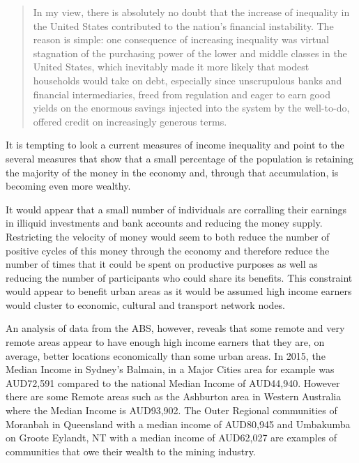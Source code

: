 \begin{quotation}
In my view, there is absolutely no doubt that the increase of inequality in the United States contributed to the nation's financial instability.  The reason is simple: one consequence of increasing inequality was virtual stagnation of the purchasing power of the lower and middle classes in the United States, which inevitably made it more likely that modest households would take on debt, especially since unscrupulous banks and financial intermediaries, freed from regulation and eager to earn good yields on the enormous savings injected into the system by the well-to-do, offered credit on increasingly generous terms\cite[pp. 372-373]{Piketty}.
\end{quotation}

 

It is tempting to look a current measures of income inequality and point to the several measures that show that a small percentage of the population is retaining the majority of the money in the economy and, through that accumulation, is becoming even more wealthy. 

It would appear that a small number of individuals are corralling their earnings in illiquid investments and bank accounts and reducing the money supply. Restricting the velocity of money would seem to both reduce the number of positive cycles of this money through the economy and therefore reduce the number of times that it could be spent on productive purposes as well as reducing the number of participants who could share its benefits. This constraint would appear to benefit urban areas as it would be assumed high income earners would cluster to economic, cultural and transport network nodes. 

An analysis of data from the ABS, however, reveals that some remote and very remote areas appear to have enough high income earners that they are, on average, better locations economically than some urban areas. In 2015, the Median Income in Sydney's Balmain, in a Major Cities area for example was AUD72,591 compared to the national Median Income of AUD44,940. However there are some Remote areas such as the Ashburton area in Western Australia where the Median Income is AUD93,902. The Outer Regional communities of Moranbah in Queensland with a median income of AUD80,945 and Umbakumba on  Groote Eylandt, NT with a median income of AUD62,027 are examples of communities that owe their wealth to the mining industry.


